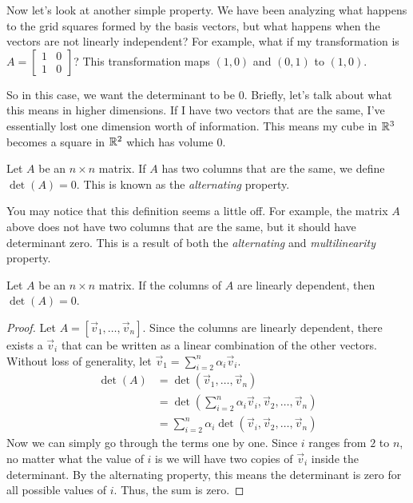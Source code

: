Now let's look at another simple property. We have been analyzing what happens to the grid squares formed by the basis vectors, but what happens when the vectors are not linearly independent? For example, what if my transformation is $A=\begin{bmatrix}
    1 & 0 \\ 1 & 0
\end{bmatrix}$? This transformation maps $(1,0)$ and $(0,1)$ to $(1,0)$.

So in this case, we want the determinant to be $0$. Briefly, let's talk about what this means in higher dimensions. If I have two vectors that are the same, I've essentially lost one dimension worth of information. This means my cube in $\mathbb{R}^3$ becomes a square in $\mathbb{R}^2$ which has volume $0$.
\begin{definition}
    Let $A$ be an $n\times n$ matrix. If $A$ has two columns that are the same, we define $\det(A)=0$. This is known as the \textit{alternating} property.
\end{definition}
You may notice that this definition seems a little off. For example, the matrix $A$ above does not have two columns that are the same, but it should have determinant zero. This is a result of both the \textit{alternating} and \textit{multilinearity} property.
\begin{theorem}
    Let $A$ be an $n\times n$ matrix. If the columns of $A$ are linearly dependent, then $\det(A)=0$.
\end{theorem}
\begin{proof}
    Let $A=[\vec{v}_1,\dots,\vec{v}_n]$. Since the columns are linearly dependent, there exists a $\vec{v}_i$ that can be written as a linear combination of the other vectors. Without loss of generality, let $\vec{v}_1=\sum_{i=2}^n\alpha_i\vec{v}_i$.
    \begin{align*}
        \det(A)&=\det(\vec{v}_1,\dots,\vec{v}_n)\\
        &=\det(\sum_{i=2}^n\alpha_i\vec{v}_i,\vec{v}_2,\dots,\vec{v}_n)\\
        &=\sum_{i=2}^n\alpha_i\det(\vec{v}_i,\vec{v}_2,\dots,\vec{v}_n)\tag{by Multilinearity}
    \end{align*}
    Now we can simply go through the terms one by one. Since $i$ ranges from $2$ to $n$, no matter what the value of $i$ is we will have two copies of $\vec{v}_i$ inside the determinant. By the alternating property, this means the determinant is zero for all possible values of $i$. Thus, the sum is zero.
\end{proof}
